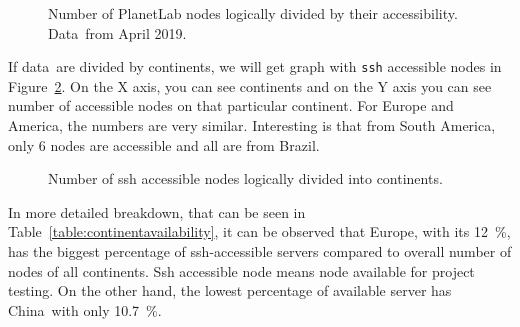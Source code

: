 {{{{{{{\begin{figure}[H]
	\centering
	\caption{Number of PlanetLab nodes logically divided by their accessibility. Data~from April 2019.}
	\label{fig:nodestats}
\end{figure}

If data~are divided by continents, we will get graph with \texttt{ssh} accessible nodes in Figure~\ref{fig:sshcountriesgraph}. On the X axis, you can see continents and on the Y axis you can see number of accessible nodes on that particular continent. For Europe and America, the numbers are very similar. Interesting is that from South America, only 6 nodes are accessible and all are from Brazil.

\begin{figure}[H]
	\centering
	\caption{Number of ssh accessible nodes logically divided into continents.}
	\label{fig:sshcountriesgraph}
\end{figure}

In more detailed breakdown, that can be seen in  Table~\ref{table:continentavailability}, it can be observed that Europe, with its \SI{12}{\percent}, has the biggest percentage of ssh-accessible servers compared to overall number of nodes of all continents. Ssh accessible node means node available for project testing. On the other hand, the lowest percentage of available server has China~with only \SI{10.7}{\percent}.

}}}}}}}
